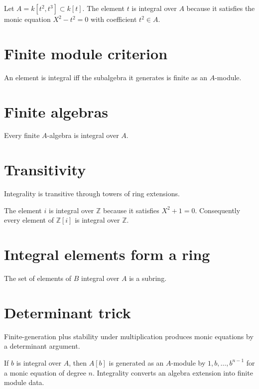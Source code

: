 \begin{example}\label{ex:v19-expand-01}
Let $A=k[t^2,t^3]\subset k[t]$. The element $t$ is integral over $A$ because it satisfies the monic equation $X^2-t^2=0$ with coefficient $t^2\in A$.
\end{example}
\section{Finite module criterion}
An element is integral iff the subalgebra it generates is finite as an $A$-module.

\section{Finite algebras}
Every finite $A$-algebra is integral over $A$.

\section{Transitivity}
Integrality is transitive through towers of ring extensions.

\begin{example}\label{ex:v19-expand-02}
The element $i$ is integral over $\mathbb Z$ because it satisfies $X^2+1=0$. Consequently every element of $\mathbb Z[i]$ is integral over $\mathbb Z$.
\end{example}
\section{Integral elements form a ring}
The set of elements of $B$ integral over $A$ is a subring.

\section{Determinant trick}
Finite-generation plus stability under multiplication produces monic equations by a determinant argument.

\begin{example}\label{ex:v19-expand-03}
If $b$ is integral over $A$, then $A[b]$ is generated as an $A$-module by $1,b,\ldots,b^{n-1}$ for a monic equation of degree $n$. Integrality converts an algebra extension into finite module data.
\end{example}
